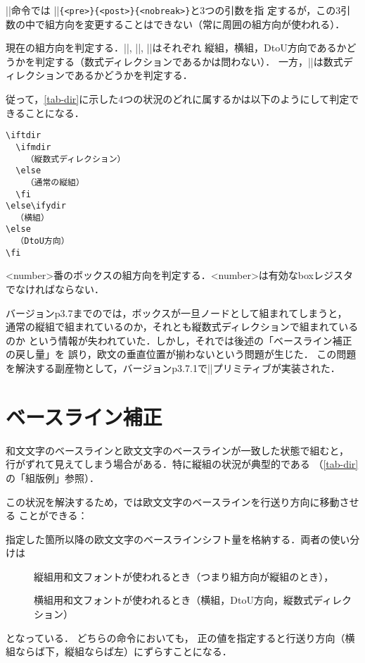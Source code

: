 \documentclass[a4paper,11pt,nomag,dvipdfmx]{jsarticle}
\begin{document}
\begin{dangerous}
 |\discretionary|命令では
|\discretionary|\texttt{\{<pre>\}\{<post>\}\{<nobreak>\}}と3つの引数を指
 定するが，この3引数の中で組方向を変更することはできない（常に周囲の組方向が使われる）．
\end{dangerous}

\begin{cslist}
  現在の組方向を判定する．|\iftdir|, |\ifydir|, |\ifddir|はそれぞれ
  縦組，横組，DtoU方向であるかどうかを判定する（数式ディレクションであるかは問わない）．
  一方，|\ifmdir|は数式ディレクションであるかどうかを判定する．

  従って，\autoref{tab-dir}に示した4つの状況のどれに属するかは以下のようにして判定できることになる．
  \begin{verbatim}
\iftdir
  \ifmdir
    （縦数式ディレクション）
  \else
    （通常の縦組）
  \fi
\else\ifydir
  （横組）
\else
  （DtoU方向）
\fi
  \end{verbatim}

  <number>番のボックスの組方向を判定する．<number>は有効なboxレジスタでなければならない．

  バージョンp3.7までの\pTeX では，ボックスが一旦ノードとして組まれてしまうと，
  通常の縦組で組まれているのか，それとも縦数式ディレクションで組まれているのか
  という情報が失われていた．しかし，それでは後述の「ベースライン補正の戻し量」を
  誤り，欧文の垂直位置が揃わないという問題が生じた\cite{tatemath}．
  この問題を解決する副産物として，バージョンp3.7.1で|\ifmbox|プリミティブが実装された．
\end{cslist}

\section{ベースライン補正}
\label{sec:baselineshift}

和文文字のベースラインと欧文文字のベースラインが一致した状態で組むと，
行がずれて見えてしまう場合がある．特に縦組の状況が典型的である
（\autoref{tab-dir}の「組版例」参照）．

この状況を解決するため，\pTeX では欧文文字のベースラインを行送り方向に移動させる
ことができる：

\begin{cslist}
\csitem[\.{tbaselineshift}=<dimen>, \.{ybaselineshift}=<dimen>]
 指定した箇所以降の欧文文字のベースラインシフト量を格納する．両者の使い分けは
 \begin{description}
  \item[\texttt{\string\tbaselineshift}]
         縦組用和文フォントが使われるとき（つまり組方向が縦組のとき），
  \item[\texttt{\string\ybaselineshift}]
         横組用和文フォントが使われるとき（横組，DtoU方向，縦数式ディレクション）
 \end{description}
 となっている．
 どちらの命令においても，
 正の値を指定すると行送り方向（横組ならば下，縦組ならば左）にずらすことになる．
\end{cslist}
\end{document}
